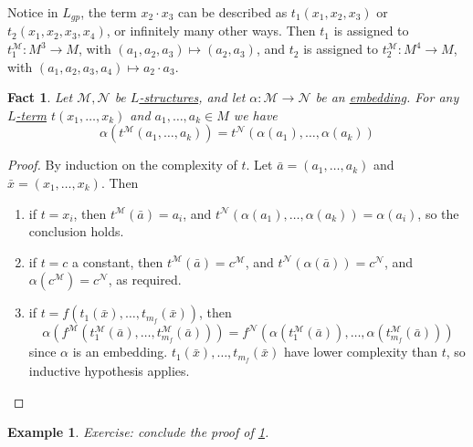 \documentclass{article}
\newtheorem{nexample}[nthm]{Example}
\newtheorem{nfact}[nthm]{Fact}
\begin{document}
Notice in $L_{gp}$, the term $x_2 \cdot x_3$ can be described as $t_1(x_1, x_2, x_3)$ or $t_2(x_1, x_2, x_3, x_4)$, or infinitely many other ways.
Then $t_1$ is assigned to $t_1^\mathcal{M}: M^3 \to M$, with $(a_1, a_2, a_3) \mapsto (a_2, a_3)$, and $t_2$ is assigned to $t_2^\mathcal{M} : M^4 \to M$, with $(a_1, a_2, a_3, a_4) \mapsto a_2 \cdot a_3$.
\begin{nfact}\label{fact:2.3}
  Let $\mathcal{M}, \mathcal{N}$ be \hyperlink{def:lstr}{$L$-structures}, and let $\alpha: \mathcal{M} \to \mathcal{N}$ be an \hyperlink{def:embedding}{embedding}.
  For any \hyperlink{def:lterm}{$L$-term} $t(x_1, \dotsc, x_k)$ and $a_1, \dotsc, a_k \in M$ we have
  \begin{equation*}
    \alpha(t^\mathcal{M}(a_1, \dotsc, a_k)) = t^\mathcal{N}(\alpha(a_1), \dotsc, \alpha(a_k))
  \end{equation*}
\end{nfact}
\begin{proof}
  By induction on the complexity of $t$. Let $\bar{a} = (a_1, \dotsc, a_k)$ and $\bar{x} = (x_1, \dotsc, x_k)$.
  Then
  \begin{enumerate}[label=(\roman*)]
    \item if $t = x_i$, then $t^\mathcal{M}(\bar{a}) = a_i$, and $t^\mathcal{N}(\alpha(a_1), \dotsc, \alpha(a_k)) = \alpha(a_i)$, so the conclusion holds.
    \item if $t = c$ a constant, then $t^\mathcal{M}(\bar{a}) = c^\mathcal{M}$, and $t^\mathcal{N}(\alpha(\bar{a})) = c^\mathcal{N}$, and $\alpha(c^\mathcal{M}) = c^\mathcal{N}$, as required.
    \item if $t = f(t_1(\bar{x}),\dotsc, t_{m_f}(\bar{x}))$, then
      \begin{equation*}
        \alpha(f^\mathcal{M}(t_1^\mathcal{M}(\bar{a}), \dotsc, t_{m_f}^\mathcal{M}(\bar{a}))) = f^\mathcal{N}(\alpha(t_1^\mathcal{M}(\bar{a})), \dotsc, \alpha(t_{m_f}^\mathcal{M}(\bar{a})))
      \end{equation*}
      since $\alpha$ is an embedding.
      $t_1(\bar{x}), \dotsc, t_{m_f}(\bar{x})$ have lower complexity than $t$, so inductive hypothesis applies.
  \end{enumerate}
\end{proof}
\begin{nexample}\label{eg:2.4}
  Exercise: conclude the proof of \cref{fact:2.3}.
\end{nexample}
\end{document}
